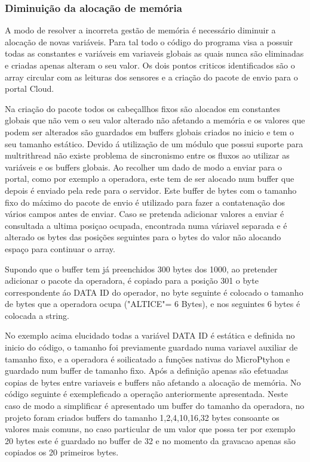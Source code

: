 \subsubsection {Diminuição da alocação de memória}

\par A modo de resolver a incorreta gestão de memória é necessário diminuir a alocação de novas variáveis. Para tal todo o código do programa visa a possuir todas as constantes e variáveis em variaveis globais as quais nunca são eliminadas e criadas apenas alteram o seu valor. Os dois pontos criticos identificados são o array circular com as leituras dos sensores e a criação do pacote de envio para o portal Cloud.
\par Na criação do pacote todos os cabeçallhos fixos são alocados em constantes globais que não vem o seu valor alterado não afetando a memória e os valores que podem ser alterados são guardados em buffers globais criados no inicio e tem o seu tamanho estático. Devido á utilização de um módulo que possui suporte para multrithread não existe problema de sincronismo entre os fluxos ao utilizar as variáveis e os buffers globais. Ao recolher um dado de modo a enviar para o portal, como por exemplo a operadora, este tem de ser alocado num buffer que depois é enviado pela rede para o servidor. Este buffer de bytes com o tamanho fixo do máximo do pacote de envio é utilizado para fazer a contatenação dos vários campos antes de enviar. Caso se pretenda adicionar valores a enviar é consultada a ultima posiçao ocupada, encontrada numa váriavel separada e é alterado os bytes das posições seguintes para o bytes do valor não alocando espaço para continuar o array.
\par Supondo que o buffer tem já preenchidos 300 bytes dos 1000, ao pretender adicionar o pacote da operadora, é copiado para a posição 301 o byte correspondente áo DATA ID do operador, no byte seguinte é colocado o tamanho de bytes que a operadora ocupa ("ALTICE"= 6 Bytes), e nos seguintes 6 bytes é colocada a string.
\par No exemplo acima elucidado todas a variável DATA ID é estática e definida no inicio do código, o tamanho foi previamente guardado numa variavel auxiliar de tamanho fixo, e a operadora é soilicatado a funções nativas do MicroPtyhon  e guardado num buffer de tamanho fixo. Após a definição apenas são efetuadas copias de bytes entre variaveis e buffers não afetando a alocação de memória. No código seguinte é exempleficado  a operação anteriormente apresentada. Neste caso de modo a simplificar é apresentado um buffer do tamanho da operadora, no projeto foram criados buffers do tamanho 1,2,4,10,16,32 bytes consoante os valores mais comuns, no caso particular de um valor que possa ter por exemplo 20 bytes este é guardado no buffer de 32 e no momento da gravacao apenas são copiados os 20 primeiros bytes.

